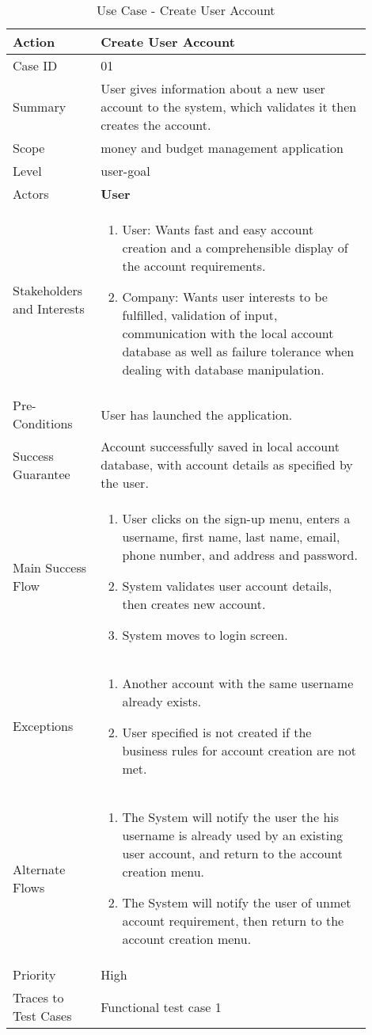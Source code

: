 \documentclass[11pt]{article}
\newcounter{use case ID}
\newcommand\tabularhead[1]{
    \begin{table}[ht]
        \addtocounter{use case ID}{1}
        \caption{Use Case \arabic{use case ID} - #1}
        \vspace{0.2cm}
        \begin{tabular}{|p{0.2\linewidth}|p{0.70\linewidth}|}
            \hline
            \textbf{Action} & \textbf{#1} \\
            \hline}
\newcommand\addrow[2]{#1 & #2\\ \hline}
\newcommand\addmulrow[2]{ \begin{minipage}[t][][t]{2.5cm}#1\end{minipage}
                &\begin{minipage}[t][][t]{11cm}
                    \begin{enumerate}[itemsep=-1ex] #2   \end{enumerate}
                \end{minipage}\vfill\\ \hline}
\newenvironment{usecase}{\tabularhead}
        {\hline\end{tabular}\end{table}}
\newcounter{req ID}
\begin{document}
\begin{usecase}{Create User Account}
    \addrow{Case ID}{01}
    \addrow{Summary}{User gives information about a new user account to the system, which validates it then creates the account.}
    \addrow{Scope}{money and budget management application}
    \addrow{Level}{user-goal}
    \addrow{Actors}{\textbf{User}}
    \addmulrow{Stakeholders and Interests}{
    \item User: Wants fast and easy account creation and a comprehensible display of the account requirements.
    \item Company: Wants user interests to be fulfilled, validation of input, communication with the local account database as well as failure tolerance when dealing with database manipulation. }
    \addrow{Pre-Conditions}{User has launched the application.}
    \addrow{Success Guarantee}{Account successfully saved in local account database, with account details as specified by the user.}
    \addmulrow{Main Success Flow}{
    \item User clicks on the sign-up menu, enters a username, first name, last name, email, phone number, and address and password.
    \item System validates user account details, then creates new account.
    \item System moves to login screen.}
    \addmulrow{Exceptions}{
    \item Another account with the same username already exists.
    \item User specified is not created if the business rules for account creation are not met.}
    \addmulrow{Alternate Flows}{
    \item The System will notify the user the his username is already used by an existing user account, and return to the account creation menu.
    \item The System will notify the user of unmet account requirement, then return to the account creation menu. }
    \addrow{Priority}{High}
    \addrow{Traces to Test Cases}{Functional test case 1}
\end{usecase}
\end{document}
